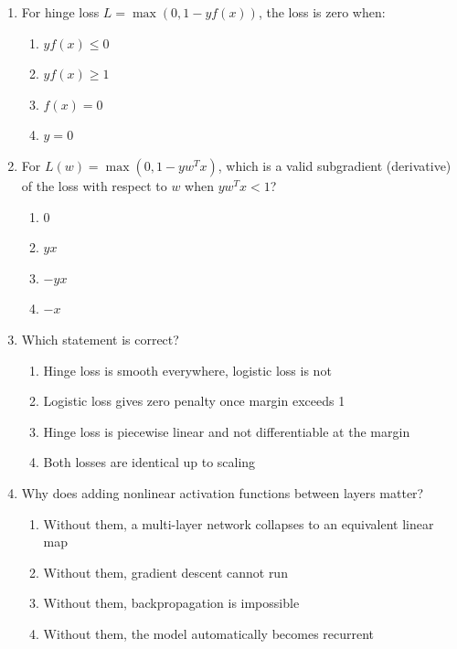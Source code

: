 \documentclass[11pt]{article}
\newcommand{\cmark}{\ding{51}}
\begin{document}
\begin{enumerate}[leftmargin=*]
\item For hinge loss $L=\max(0,1-yf(x))$, the loss is zero when:

\begin{enumerate}[label=\Alph*.]
    \item $yf(x)\le 0$
    \item $yf(x)\ge 1$ \cmark
    \item $f(x)=0$
    \item $y=0$
\end{enumerate}

\item For $L(w)=\max(0,1-yw^Tx)$, which is a valid subgradient (derivative) of the loss with respect to $w$ when $yw^Tx < 1$?

\begin{enumerate}[label=\Alph*.]
    \item $0$
    \item $yx$
    \item $-yx$ \cmark
    \item $-x$
\end{enumerate}

\item Which statement is correct?

\begin{enumerate}[label=\Alph*.]
    \item Hinge loss is smooth everywhere, logistic loss is not
    \item Logistic loss gives zero penalty once margin exceeds 1
    \item Hinge loss is piecewise linear and not differentiable at the margin \cmark
    \item Both losses are identical up to scaling
\end{enumerate}

\item Why does adding nonlinear activation functions between layers matter?

\begin{enumerate}[label=\Alph*.]
    \item Without them, a multi-layer network collapses to an equivalent linear map \cmark
    \item Without them, gradient descent cannot run
    \item Without them, backpropagation is impossible
    \item Without them, the model automatically becomes recurrent
\end{enumerate}


\end{enumerate}
\end{document}
